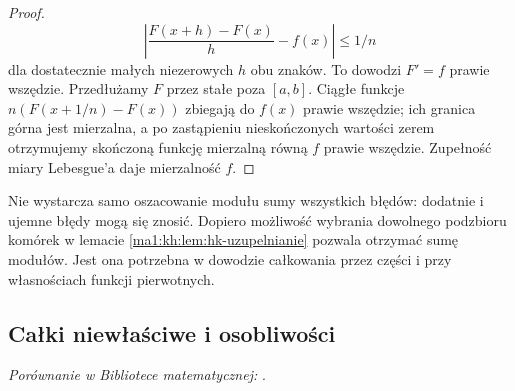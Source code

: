 \begin{proof}
\[
 \left|\frac{F(x+h)-F(x)}h-f(x)\right|\le1/n
\]
dla dostatecznie małych niezerowych $h$ obu znaków. To dowodzi $F'=f$ prawie wszędzie. Przedłużamy $F$ przez stałe poza $[a,b]$. Ciągłe funkcje $n(F(x+1/n)-F(x))$ zbiegają do $f(x)$ prawie wszędzie; ich granica górna jest mierzalna, a po zastąpieniu nieskończonych wartości zerem otrzymujemy skończoną funkcję mierzalną równą $f$ prawie wszędzie. Zupełność miary Lebesgue'a daje mierzalność $f$.
\end{proof}
\begin{uwaga}
Nie wystarcza samo oszacowanie modułu sumy wszystkich błędów: dodatnie i ujemne błędy mogą się znosić. Dopiero możliwość wybrania dowolnego podzbioru komórek w lemacie \ref{ma1:kh:lem:hk-uzupelnianie} pozwala otrzymać sumę modułów. Jest ona potrzebna w dowodzie całkowania przez części i przy własnościach funkcji pierwotnych.
\end{uwaga}
\subsection{Całki niewłaściwe i osobliwości}
\noindent\emph{Porównanie w Bibliotece matematycznej:} .

